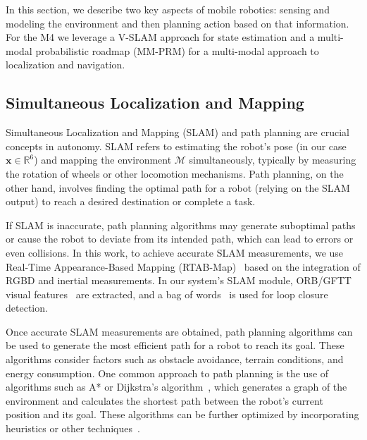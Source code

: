 \documentclass[letterpaper, 10 pt, conference]{ieeeconf}  %
\begin{document}
In this section, we describe two key aspects of mobile robotics: sensing and modeling the environment and then planning action based on that information. For the M4 we leverage a V-SLAM approach for state estimation and a multi-modal probabilistic roadmap (MM-PRM) for a multi-modal approach to localization and navigation.

\subsection{Simultaneous Localization and Mapping}

Simultaneous Localization and Mapping (SLAM) and path planning are crucial concepts in autonomy. SLAM refers to estimating the robot's pose (in our case $\mathbf{x}\in\mathbb{R}^6$) and mapping the environment $\mathcal{M}$ simultaneously, typically by measuring the rotation of wheels or other locomotion mechanisms. Path planning, on the other hand, involves finding the optimal path for a robot (relying on the SLAM output) to reach a desired destination or complete a task.

If SLAM is inaccurate, path planning algorithms may generate suboptimal paths or cause the robot to deviate from its intended path, which can lead to errors or even collisions. In this work, to achieve accurate SLAM measurements, we use Real-Time Appearance-Based Mapping (RTAB-Map)~\cite{labbe2019rtab} based on the integration of RGBD and inertial measurements. In our system's SLAM module, ORB/GFTT visual features~\cite{orb, gftt} are extracted, and a bag of words~\cite{bow} is used for loop closure detection.

Once accurate SLAM measurements are obtained, path planning algorithms can be used to generate the most efficient path for a robot to reach its goal. These algorithms consider factors such as obstacle avoidance, terrain conditions, and energy consumption.
One common approach to path planning is the use of algorithms such as A* or Dijkstra's algorithm~{\cite{A_star, dijkstra1959note, comboplanner}}, which generates a graph of the environment and calculates the shortest path between the robot's current position and its goal. These algorithms can be further optimized by incorporating heuristics or other techniques~{\cite{visgraph, Astar_heuristics, Astar_time}}.
\end{document}
